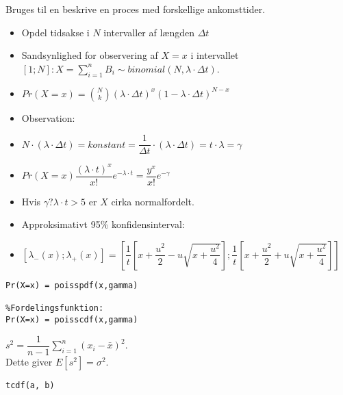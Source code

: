 \documentclass[Main]{subfiles}
\begin{document}
\begin{theo}[Poissonfordeling]
Bruges til en beskrive en proces med forskellige ankomsttider.
\begin{itemize}
	\item Opdel tidsakse i $N$ intervaller af længden $\Delta t$
	
	\item Sandsynlighed for observering af $X = x$ i intervallet $[1;N]: X = \sum_{i=1}^n B_i \sim binomial(N, \lambda \cdot \Delta t)$.
	
	\item[] $Pr(X=x) = \binom{N}{k}(\lambda \cdot \Delta t)^x(1-\lambda \cdot \Delta t)^{N-x}$
	
	\item Observation:
	
	\item[] $N \cdot (\lambda \cdot \Delta t) = konstant = \dfrac{1}{\Delta t} \cdot (\lambda \cdot \Delta t) = t \cdot \lambda = \gamma$
	
	\item[] $Pr(X=x) \dfrac{(\lambda \cdot t)^x}{x!} e^{-\lambda \cdot t} = \dfrac{y^x}{x!}e^{-\gamma} $

	\item Hvis $\gamma ? \lambda \cdot t > 5$ er $X$ cirka normalfordelt.

	\item Approksimativt 95\% konfidensinterval:
	\item[]$[\lambda_-(x);\lambda_+(x)] = \left[\dfrac{1}{t}\left[x+\dfrac{u^2}{2}-u \sqrt{x+\dfrac{u^2}{4}}\right] ; \dfrac{1}{t}\left[x+\dfrac{u^2}{2}+u \sqrt{x+\dfrac{u^2}{4}}\right] \right]$
\end{itemize}
\begin{lstlisting}[style=Code-Matlab]
%TEthedsfunktion:
Pr(X=x) = poisspdf(x,gamma)

%Fordelingsfunktion:
Pr(X=x) = poisscdf(x,gamma)
\end{lstlisting}
\end{theo}

\begin{theo}
$s^2 = \dfrac{1}{n-1} \sum_{i=1}^n (x_i - \bar{x})^2$.
\\
Dette giver $E[s^2] = \sigma^2$.
\end{theo}

\begin{lstlisting}[caption=P-værdi af ukendt varians, style=Code-Matlab]
tcdf(a, b)
\end{lstlisting}
\end{document}

